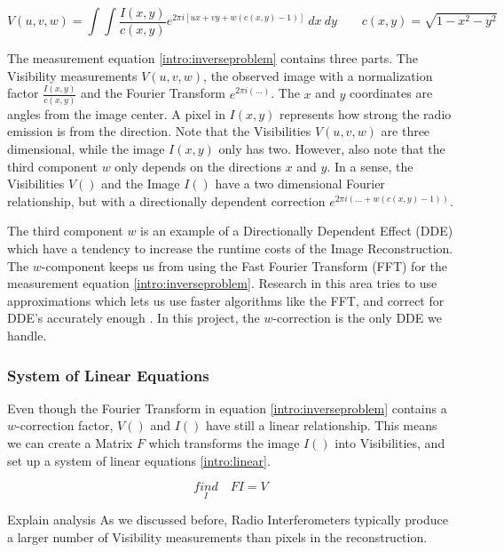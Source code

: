 \begin{equation}\label{intro:inverseproblem}
V(u, v, w) = \int\int  \frac{I(x, y)}{c(x, y)}  e^{2 \pi i [ux+vy+ w(c(x, y) - 1)]} \: dx \: dy \quad \quad c(x,y) = \sqrt{1 - x^2 - y ^2}
\end{equation}

The measurement equation \eqref{intro:inverseproblem} contains three parts. The Visibility measurements $V(u,v,w)$, the observed image with a normalization factor $\frac{I(x, y)}{c(x, y)}$ and the Fourier Transform $e^{2 \pi i (\ldots)}$. The $x$ and $y$ coordinates are angles from the image center. A pixel in $I(x,y)$ represents how strong the radio emission is from the direction. Note that the Visibilities $V(u,v,w)$ are three dimensional, while the image $I(x,y)$ only has two. However, also note that the third component $w$ only depends on the directions $x$ and $y$. In a sense, the Visibilities $V()$ and the Image $I()$ have a two dimensional Fourier relationship, but with a directionally dependent correction $e^{2 \pi i (\ldots +w(c(x, y) - 1))}$. 

The third component $w$ is an example of a Directionally Dependent Effect (DDE) which have a tendency to increase the runtime costs of the Image Reconstruction. The $w$-component keeps us from using the Fast Fourier Transform (FFT) for the measurement equation \eqref{intro:inverseproblem}. Research in this area tries to use approximations which lets us use faster algorithms like the FFT, and correct for DDE's accurately enough \cite{veenboer2017image, offringa2014wsclean, pratley2018fast}. In this project, the $w$-correction is the only DDE we handle.

\subsubsection{System of Linear Equations}
Even though the Fourier Transform in equation \eqref{intro:inverseproblem} contains a $w$-correction factor, $V()$ and $I()$ have still a linear relationship. This means we can create a Matrix $F$ which transforms the image $I()$ into Visibilities, and set up a system of linear equations \eqref{intro:linear}.

\begin{equation}\label{intro:linear}
\underset{I}{find}\quad FI = V
\end{equation}


Explain analysis
As we discussed before, Radio Interferometers typically produce a larger number of Visibility measurements than pixels in the reconstruction.

